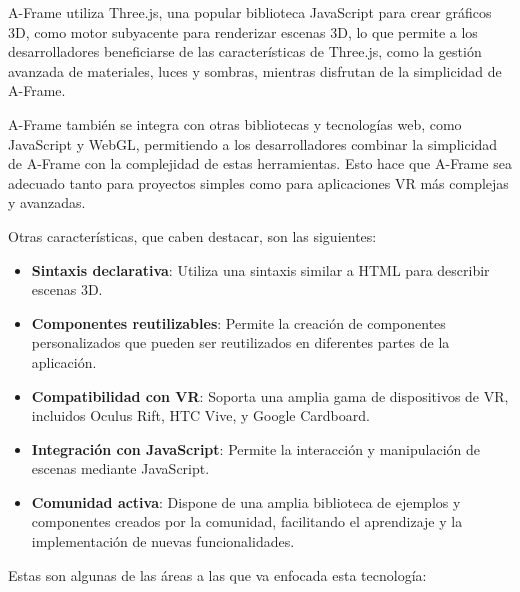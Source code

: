 \documentclass[a4paper, 12pt]{book}
\begin{document}
        A-Frame utiliza Three.js, una popular biblioteca JavaScript para crear gráficos 3D, como motor subyacente para renderizar escenas 3D, lo que permite a los desarrolladores beneficiarse de las características de Three.js, como la gestión avanzada de materiales, luces y sombras, mientras disfrutan de la simplicidad de A-Frame.

        A-Frame también se integra con otras bibliotecas y tecnologías web, como JavaScript y WebGL, permitiendo a los desarrolladores combinar la simplicidad de A-Frame con la complejidad de estas herramientas. Esto hace que A-Frame sea adecuado tanto para proyectos simples como para aplicaciones VR más complejas y avanzadas.

        Otras características, que caben destacar, son las siguientes:
        \begin{itemize}
            \item \textbf{Sintaxis declarativa}: Utiliza una sintaxis similar a HTML para describir escenas 3D.
            \item \textbf{Componentes reutilizables}: Permite la creación de componentes personalizados que pueden ser reutilizados en diferentes partes de la aplicación.
            \item \textbf{Compatibilidad con VR}: Soporta una amplia gama de dispositivos de VR, incluidos Oculus Rift, HTC Vive, y Google Cardboard.
            \item \textbf{Integración con JavaScript}: Permite la interacción y manipulación de escenas mediante JavaScript.
            \item \textbf{Comunidad activa}: Dispone de una amplia biblioteca de ejemplos y componentes creados por la comunidad, facilitando el aprendizaje y la implementación de nuevas funcionalidades.
        \end{itemize}

        Estas son algunas de las áreas a las que va enfocada esta tecnología:
\end{document}
